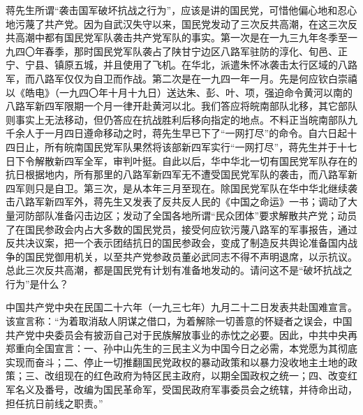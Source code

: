 蒋先生所谓“袭击国军破坏抗战之行为”，应该是讲的国民党，可惜他偏心地和忍心地污蔑了共产党。因为自武汉失守以来，国民党发动了三次反共高潮，在这三次反共高潮中都有国民党军队袭击共产党军队的事实。第一次是在一九三九年冬季至一九四〇年春季，那时国民党军队袭占了陕甘宁边区八路军驻防的淳化、旬邑、正宁、宁县、镇原五城，并且使用了飞机。在华北，派遣朱怀冰袭击太行区域的八路军，而八路军仅仅为自卫而作战。第二次是在一九四一年一月。先是何应钦白崇禧以《皓电》（一九四〇年十月十九日）送达朱、彭、叶、项，强迫命令黄河以南的八路军新四军限期一个月一律开赴黄河以北。我们答应将皖南部队北移，其它部队则事实上无法移动，但仍答应在抗战胜利后移向指定的地点。不料正当皖南部队九千余人于一月四日遵命移动之时，蒋先生早已下了“一网打尽”的命令。自六日起十四日止，所有皖南国民党军队果然将该部新四军实行“一网打尽”，蒋先生并于十七日下令解散新四军全军，审判叶挺。自此以后，华中华北一切有国民党军队存在的抗日根据地内，所有那里的八路军新四军无不遭受国民党军队的袭击，而八路军新四军则只是自卫。第三次，是从本年三月至现在。除国民党军队在华中华北继续袭击八路军新四军外，蒋先生又发表了反共反人民的《中国之命运》一书；调动了大量河防部队准备闪击边区；发动了全国各地所谓“民众团体”要求解散共产党；动员了在国民参政会内占大多数的国民党员，接受何应钦污蔑八路军的军事报告，通过反共决议案，把一个表示团结抗日的国民参政会，变成了制造反共舆论准备国内战争的国民党御用机关，以至共产党参政员董必武同志不得不声明退席，以示抗议。总此三次反共高潮，都是国民党有计划有准备地发动的。请问这不是“破坏抗战之行为”是什么？

中国共产党中央在民国二十六年（一九三七年）九月二十二日发表共赴国难宣言。该宣言称：“为着取消敌人阴谋之借口，为着解除一切善意的怀疑者之误会，中国共产党中央委员会有披沥自己对于民族解放事业的赤忱之必要。因此，中共中央再郑重向全国宣言：一、孙中山先生的三民主义为中国今日之必需，本党愿为其彻底实现而奋斗；二、停止一切推翻国民党政权的暴动政策和以暴力没收地主土地的政策；三、改组现在的红色政府为特区民主政府，以期全国政权之统一；四、改变红军名义及番号，改编为国民革命军，受国民政府军事委员会之统辖，并待命出动，担任抗日前线之职责。”

